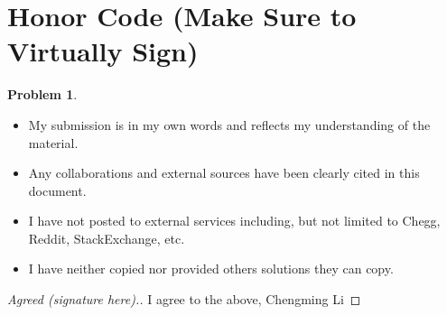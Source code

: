 \documentclass[11pt]{article}
\theoremstyle{definition}
\theoremstyle{definition}
\newtheorem{required}{Problem}
\theoremstyle{definition}
\begin{document}
\section{Honor Code (Make Sure to Virtually Sign)} \label{HonorCode}

\begin{required}
\begin{itemize}
\item My submission is in my own words and reflects my understanding of the material.
\item Any collaborations and external sources have been clearly cited in this document.
\item I have not posted to external services including, but not limited to Chegg, Reddit, StackExchange, etc.
\item I have neither copied nor provided others solutions they can copy.
\end{itemize}

\end{required}

\begin{proof}[Agreed (signature here).]
I agree to the above, Chengming Li
\end{proof}




\newpage
\end{document}
